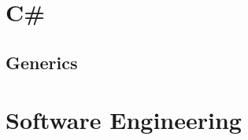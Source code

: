 \documentclass[11pt,oneside]{book}
\begin{document}
   \frontmatter
   \tableofcontents

   \mainmatter
   \chapter{C#}
   \section{Generics}

   \chapter{Software Engineering}
\end{document}
